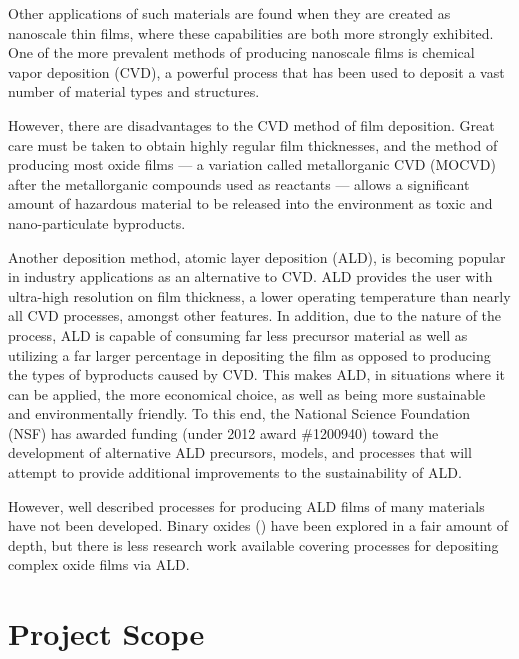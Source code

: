 Other applications of such materials are found when they are created as nanoscale thin films, where these capabilities are both more strongly exhibited. One of the more prevalent methods of producing nanoscale films is chemical vapor deposition (CVD), a powerful process that has been used to deposit a vast number of material types and structures.\cite{Matsumara_1998}

However, there are disadvantages to the CVD method of film deposition. Great care must be taken to obtain highly regular film thicknesses, and the method of producing most oxide films --- a variation called metallorganic CVD (MOCVD) after the metallorganic compounds used as reactants --- allows a significant amount of hazardous material to be released into the environment as toxic and nano-particulate byproducts. 

Another deposition method, atomic layer deposition (ALD), is becoming popular in industry applications as an alternative to CVD. ALD provides the user with ultra-high resolution on film thickness, a lower operating temperature than nearly all CVD processes, amongst other features. In addition, due to the nature of the process, ALD is capable of consuming far less precursor material as well as utilizing a far larger percentage in depositing the film as opposed to producing the types of byproducts caused by CVD.\cite{ALD-Handbook} This makes ALD, in situations where it can be applied, the more economical choice, as well as being more sustainable and environmentally friendly. To this end, the National Science Foundation (NSF) has awarded funding (under 2012 award \#1200940) toward the development of alternative ALD precursors, models, and processes that will attempt to provide additional improvements to the sustainability of ALD.

However, well described processes for producing ALD films of many materials have not been developed. Binary oxides () have been explored in a fair amount of depth,\cite{chen_atomic_2007,de_ridder_growth_2002,knez_atomic_2006,lee_al2o3_2003,scheffe_atomic_2009} but there is less research work available covering processes for depositing complex oxide films via ALD. 


\section{Project Scope}
\label{sec:Intro-Scope}

